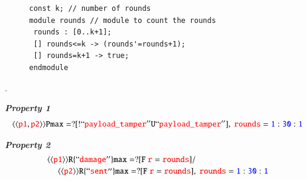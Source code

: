 \begin{figure}[!htb]            
\begin{minipage}{16.5cm}
\begin{lstlisting}[style=framed,%customc, 
caption=Rounds module to Express multiple Tentatives ,
 	label=lst:rounds]	
const k; // number of rounds
module rounds // module to count the rounds
 rounds : [0..k+1];
 [] rounds<=k -> (rounds'=rounds+1);
 [] rounds=k+1 -> true;
endmodule
\end{lstlisting}
 \end{minipage}  
\end{figure}




.


 
	    
	    \begin{resp}{\textbf{\textit{Property 1}}}
        \begin{equation}
        \label{eq1}
        \mathtt{\gl{\gl{\textcolor{red}{p1},\textcolor{red}{p2}}}Pmax=? [ !\quot{\textcolor{red}{payload\_tamper}} U \quot{\textcolor{red}{payload\_tamper}}  ]}, \mathtt{\ \textcolor{red}{rounds}=\textcolor{blue}{1}:\textcolor{blue}{30}:\textcolor{blue}{1}} 
        \end{equation}
        \end{resp}
       
        
 
	   
	    \begin{resp}{\textbf{\textit{Property 2}}}
        \begin{equation}
        \label{eq2}
        \splitdfrac{\mathtt{ \gl{\gl{\textcolor{red}{p1}}}R{\{\quot{\textcolor{red}{damage}}\}}max=? [ F \ \textcolor{red}{r}=\textcolor{red}{rounds} ]/}}{\mathtt{\ \gl{\gl{\textcolor{red}{p2}}}R{ \{\quot{\textcolor{red}{sent}}\}}max=? [ F\ \textcolor{red}{r}=\textcolor{red}{rounds} ],  \ \textcolor{red}{rounds}=\textcolor{blue}{1}:\textcolor{blue}{30}:\textcolor{blue}{1}}}
        \end{equation}
        \end{resp}
        

